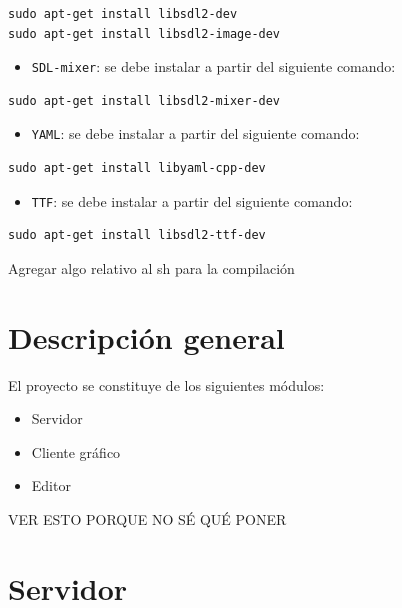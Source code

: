 \documentclass[a4paper]{article}
\begin{document}
\begin{verbatim}
sudo apt-get install libsdl2-dev
sudo apt-get install libsdl2-image-dev
\end{verbatim}

\begin{itemize}
	\item \texttt{SDL-mixer}: se debe instalar a partir del siguiente comando:
\end{itemize}

\begin{verbatim}
sudo apt-get install libsdl2-mixer-dev
\end{verbatim}

\begin{itemize}
	\item \texttt{YAML}: se debe instalar a partir del siguiente comando:
\end{itemize}

\begin{verbatim}
sudo apt-get install libyaml-cpp-dev
\end{verbatim}

\begin{itemize}
	\item \texttt{TTF}: se debe instalar a partir del siguiente comando:
\end{itemize}

\begin{verbatim}
sudo apt-get install libsdl2-ttf-dev
\end{verbatim}

Agregar algo relativo al sh para la compilación

\section{Descripción general}

El proyecto se constituye de los siguientes módulos:

\begin{itemize}
	\item Servidor
	\item Cliente gráfico
	\item Editor
\end{itemize}

VER ESTO PORQUE NO SÉ QUÉ PONER

\section{Servidor}
\end{document}
